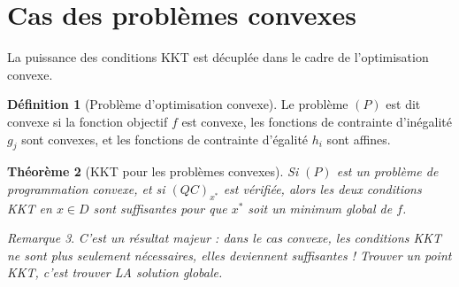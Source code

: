 \documentclass[a4paper,12pt,openany]{book}
\theoremstyle{plain}
\newtheorem{theorem}{Théorème}[section]
\theoremstyle{definition}
\newtheorem{definition}[theorem]{Définition}
\theoremstyle{remark}
\newtheorem{remark}[theorem]{Remarque}
\theoremstyle{nbstyle}
\begin{document}
	\section{Cas des problèmes convexes}
	La puissance des conditions KKT est décuplée dans le cadre de l'optimisation convexe.
	
	\begin{definition}[Problème d'optimisation convexe]
		Le problème $(P)$ est dit convexe si la fonction objectif $f$ est convexe, les fonctions de contrainte d'inégalité $g_j$ sont convexes, et les fonctions de contrainte d'égalité $h_i$ sont affines.
	\end{definition}
	
	\begin{theorem}[KKT pour les problèmes convexes]	
		Si $ (P) $ est un problème de programmation convexe, et si $ (QC)_{x^{*}}$ est vérifiée, alors les deux conditions KKT en $ x\in D $ sont suffisantes pour que $ x^{*} $ soit un minimum global de $ f $.
	\end{theorem}
	\begin{remark}
		\textit{C'est un résultat majeur : dans le cas convexe, les conditions KKT ne sont plus seulement nécessaires, elles deviennent suffisantes ! Trouver un point KKT, c'est trouver LA solution globale.}
	\end{remark}
	
\end{document}
